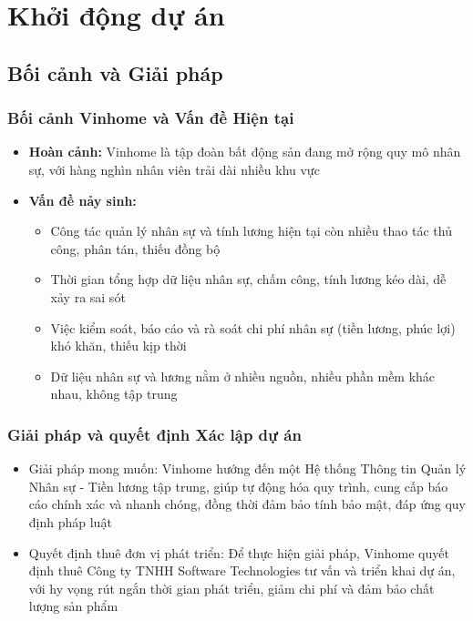 \chapter{Khởi động dự án}
\label{Chapter1}
\section{Bối cảnh và Giải pháp}
\subsection{Bối cảnh Vinhome và Vấn đề Hiện tại}
\begin{itemize}
    \item \textbf{Hoàn cảnh:} Vinhome là tập đoàn bất động sản đang mở rộng quy mô nhân sự, với hàng nghìn nhân viên trải dài nhiều khu vực
    \item \textbf{Vấn đề nảy sinh:}
    \begin{itemize}
        \item Công tác quản lý nhân sự và tính lương hiện tại còn nhiều thao tác thủ công, phân tán, thiếu đồng bộ
        \item Thời gian tổng hợp dữ liệu nhân sự, chấm công, tính lương kéo dài, dễ xảy ra sai sót
        \item Việc kiểm soát, báo cáo và rà soát chi phí nhân sự (tiền lương, phúc lợi) khó khăn, thiếu kịp thời
        \item Dữ liệu nhân sự và lương nằm ở nhiều nguồn, nhiều phần mềm khác nhau, không tập trung
    \end{itemize}
\end{itemize}
\subsection{Giải pháp và quyết định Xác lập dự án}
\begin{itemize}
    \item Giải pháp mong muốn: Vinhome hướng đến một Hệ thống Thông tin Quản lý Nhân sự - Tiền lương tập trung, giúp tự động hóa quy trình, cung cấp báo cáo chính xác và nhanh chóng, đồng thời đảm bảo tính bảo mật, đáp ứng quy định pháp luật
    \item Quyết định thuê đơn vị phát triển: Để thực hiện giải pháp, Vinhome quyết định thuê Công ty TNHH Software Technologies tư vấn và triển khai dự án, với hy vọng rút ngắn thời gian phát triển, giảm chi phí và đảm bảo chất lượng sản phẩm
\end{itemize}

